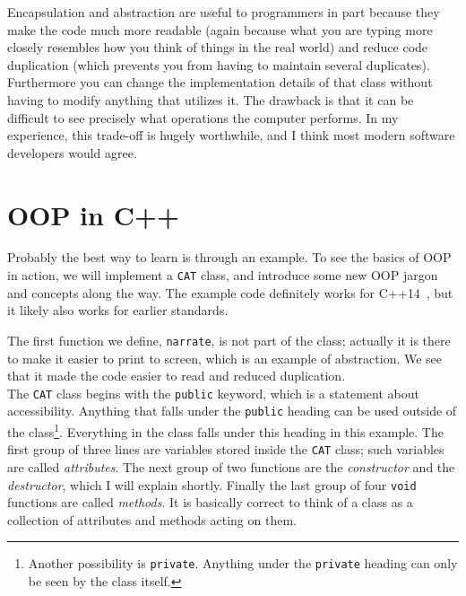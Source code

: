 Encapsulation and abstraction are useful to programmers in part because
they make the code much more readable (again because what you are typing
more closely resembles how you think of things in the real world) and
reduce code duplication (which prevents you from having to maintain
several duplicates). Furthermore you
can change the implementation details of that class
without having to modify anything that utilizes it. The drawback is that
it can be difficult to see precisely what operations the computer
performs. In my experience, this trade-off is hugely worthwhile, and I think
most modern software developers would agree.

\section{OOP in C++} 
Probably the best way to learn is through an example. To see the basics
of OOP in action, we will implement a \texttt{CAT} class, and 
introduce some new OOP jargon and concepts along the way.
The example code definitely works for C++14~\cite{cppDocumentation},
but it likely also works for earlier standards.

The first function we define, \texttt{narrate}, is not part of the class;
actually it is there to make it easier to print to screen, which is
an example of abstraction. We see that it made the code easier to
read and reduced duplication.\\



The \texttt{CAT} class begins with the \texttt{public} keyword, which
is a statement about accessibility. Anything that falls under the
\texttt{public} heading can be used outside of the class\footnote{Another
possibility is \texttt{private}. Anything under the \texttt{private} heading
can only be seen by the class itself.}. Everything in the class falls
under this heading in this example. The first group of three lines
are variables stored inside the \texttt{CAT} class; such variables
are called {\it attributes}. The next group of two functions are
the {\it constructor} and the {\it destructor}, which I will explain
shortly. Finally the last group of four \texttt{void} functions are 
called {\it methods}. It is basically correct to think of a class as a
collection of attributes and methods acting on them.\\

